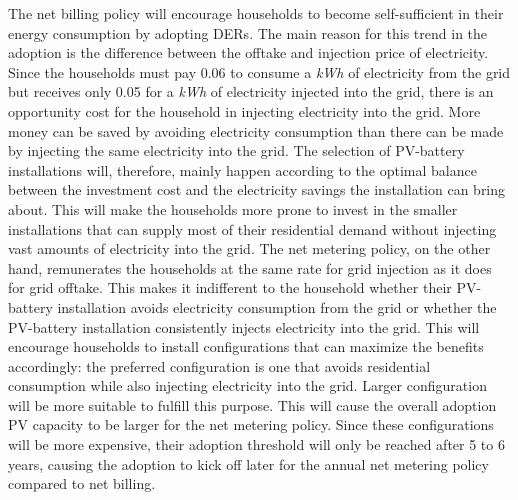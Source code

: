 \newline \newline \noindent
The net billing policy will encourage households to become self-sufficient in their energy consumption by adopting DERs. The main reason for this trend in the adoption is the difference between the offtake and injection price of electricity. Since the households must pay 0.06 \EUR{} to consume a \textit{kWh} of electricity from the grid but receives only 0.05 \EUR{} for a \textit{kWh} of electricity injected into the grid, there is an opportunity cost for the household in injecting electricity into the grid. More money can be saved by avoiding electricity consumption than there can be made by injecting the same electricity into the grid. The selection of PV-battery installations will, therefore, mainly happen according to the optimal balance between the investment cost and the electricity savings the installation can bring about. This will make the households more prone to invest in the smaller installations that can supply most of their residential demand without injecting vast amounts of electricity into the grid. 
\newline \newline \noindent
The net metering policy, on the other hand, remunerates the households at the same rate for grid injection as it does for grid offtake. This makes it indifferent to the household whether their PV-battery installation avoids electricity consumption from the grid or whether the PV-battery installation consistently injects electricity into the grid. This will encourage households to install configurations that can maximize the benefits accordingly: the preferred configuration is one that avoids residential consumption while also injecting electricity into the grid. Larger configuration will be more suitable to fulfill this purpose. This will cause the overall adoption PV capacity to be larger for the net metering policy. Since these configurations will be more expensive, their adoption threshold will only be reached after 5 to 6 years, causing the adoption to kick off later for the annual net metering policy compared to net billing.
\newline \newline \noindent
